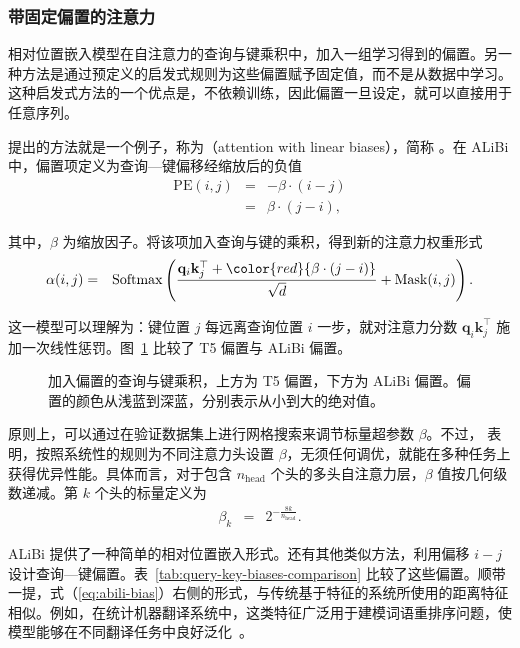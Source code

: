 \subsubsection{带固定偏置的注意力}

\noindent 相对位置嵌入模型在自注意力的查询与键乘积中，加入一组学习得到的偏置。另一种方法是通过预定义的启发式规则为这些偏置赋予固定值，而不是从数据中学习。这种启发式方法的一个优点是，不依赖训练，因此偏置一旦设定，就可以直接用于任意序列。

\citet{press-etal:2022train} 提出的方法就是一个例子，称为（attention with linear biases），简称 。在 ALiBi 中，偏置项定义为查询—键偏移经缩放后的负值
\begin{eqnarray}
\mathrm{PE}(i,j) & = & -\beta \cdot (i - j) \nonumber \\
                 & = & \beta \cdot (j - i) \label{eq:abili-bias},
\end{eqnarray}

\noindent 其中，$\beta$ 为缩放因子。将该项加入查询与键的乘积，得到新的注意力权重形式
\begin{eqnarray}
\alpha(i,j) & = & \mathrm{Softmax} \left(\frac{\mathbf{q}_i \mathbf{k}_{j}^\top + \color{red}{\beta \cdot (j - i)}}{\sqrt{d}} + \mathrm{Mask}(i,j) \right).
\end{eqnarray}

这一模型可以理解为：键位置 $j$ 每远离查询位置 $i$ 一步，就对注意力分数 $\mathbf{q}_i \mathbf{k}_{j}^\top$ 施加一次线性惩罚。图~\ref{fig:T5-and-ALiBi-biases} 比较了 T5 偏置与 ALiBi 偏置。

\begin{figure}[!t]
\centering

\caption{加入偏置的查询与键乘积，上方为 T5 偏置，下方为 ALiBi 偏置。偏置的颜色从浅蓝到深蓝，分别表示从小到大的绝对值。}
\label{fig:T5-and-ALiBi-biases}
\end{figure}

原则上，可以通过在验证数据集上进行网格搜索来调节标量超参数 $\beta$。不过，\citet{press-etal:2022train} 表明，按照系统性的规则为不同注意力头设置 $\beta$，无须任何调优，就能在多种任务上获得优异性能。具体而言，对于包含 $n_{\mathrm{head}}$ 个头的多头自注意力层，$\beta$ 值按几何级数递减。第 $k$ 个头的标量定义为
\begin{eqnarray}
\beta_k & = & 2^{-\frac{8k}{n_{\mathrm{head}}}}. \label{eq:alibi-beta}
\end{eqnarray}

ALiBi 提供了一种简单的相对位置嵌入形式。还有其他类似方法，利用偏移 $i - j$ 设计查询—键偏置。表~\ref{tab:query-key-biases-comparison} 比较了这些偏置。顺带一提，式（\ref{eq:abili-bias}）右侧的形式，与传统基于特征的系统所使用的距离特征相似。例如，在统计机器翻译系统中，这类特征广泛用于建模词语重排序问题，使模型能够在不同翻译任务中良好泛化~\cite{Koehn:2010}。

